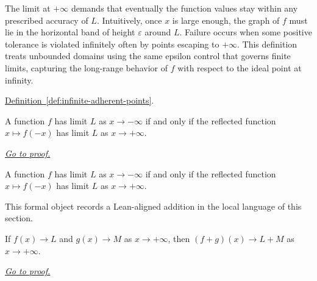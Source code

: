 \begin{remark*}[Interpretation]
The limit at $+\infty$ demands that eventually the function values stay within any prescribed accuracy of $L$. Intuitively, once $x$ is large enough, the graph of $f$ must lie in the horizontal band of height $\varepsilon$ around $L$. Failure occurs when some positive tolerance is violated infinitely often by points escaping to $+\infty$. This definition treats unbounded domains using the same epsilon control that governs finite limits, capturing the long-range behavior of $f$ with respect to the ideal point at infinity.
\end{remark*}

\begin{dependencies}
\hyperref[def:infinite-adherent-points]{Definition~\ref*{def:infinite-adherent-points}}.
\end{dependencies}

\begin{theorem}
\label{thm:limit-at-neg-infinity-iff-reflection}
A function $f$ has limit $L$ as $x\to -\infty$ if and only if the reflected function $x\mapsto f(-x)$ has limit $L$ as $x\to +\infty$.

\smallskip
\noindent
\hyperref[prf:limit-at-neg-infinity-iff-reflection]{\textit{Go to proof.}}
\end{theorem}

\begin{remark*}
A function $f$ has limit $L$ as $x\to -\infty$ if and only if the reflected function $x\mapsto f(-x)$ has limit $L$ as $x\to +\infty$.
\end{remark*}

\begin{remark*}[Interpretation]
This formal object records a Lean-aligned addition in the local language of this section.
\end{remark*}

\begin{dependencies}
\NoLocalDependencies
\end{dependencies}
\begin{theorem}
\label{thm:tendsto-infty-add}
If $f(x)\to L$ and $g(x)\to M$ as $x\to+\infty$, then $(f+g)(x)\to L+M$ as $x\to+\infty$.

\smallskip
\noindent
\hyperref[prf:tendsto-infty-add]{\textit{Go to proof.}}
\end{theorem}

